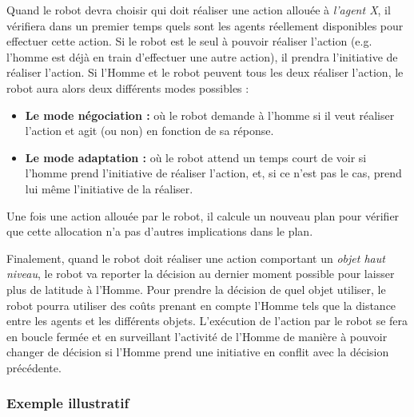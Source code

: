 \documentclass[english,a4paper,11pt,twoside]{StyleThese}
\begin{document}
Quand le robot devra choisir qui doit réaliser une action allouée à \textit{l'agent X}, il vérifiera dans un premier temps quels sont les agents réellement disponibles pour effectuer cette action. Si le robot est le seul à pouvoir réaliser l'action (e.g. l'homme est déjà en train d'effectuer une autre action), il prendra l'initiative de réaliser l'action. Si l'Homme et le robot peuvent tous les deux réaliser l'action, le robot aura alors deux différents modes possibles :
\begin{itemize}
\item \textbf{Le mode négociation :} où le robot demande à l'homme si il veut réaliser l'action et agit (ou non) en fonction de sa réponse.
\item \textbf{Le mode adaptation :} où le robot attend un temps court de voir si l'homme prend l'initiative de réaliser l'action, et, si ce n'est pas le cas, prend lui même l'initiative de la réaliser.
\end{itemize}
Une fois une action allouée par le robot, il calcule un nouveau plan pour vérifier que cette allocation n'a pas d'autres implications dans le plan.

Finalement, quand le robot doit réaliser une action comportant un \textit{objet haut niveau}, le robot va reporter la décision au dernier moment possible pour laisser plus de latitude à l'Homme. Pour prendre la décision de quel objet utiliser, le robot pourra utiliser des coûts prenant en compte l'Homme tels que la distance entre les agents et les différents objets. L'exécution de l'action par le robot se fera en boucle fermée et en surveillant l'activité de l'Homme de manière à pouvoir changer de décision si l'Homme prend une initiative en conflit avec la décision précédente.

\subsubsection{Exemple illustratif}
\end{document}
